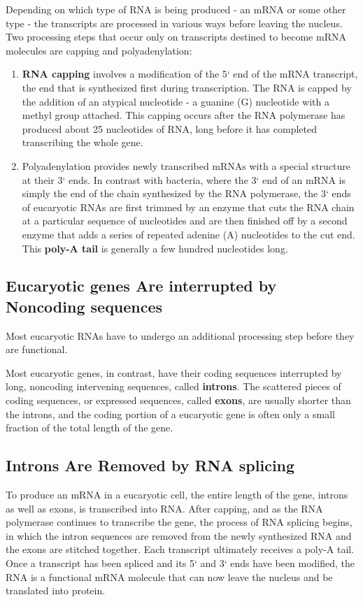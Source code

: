 Depending on which type of RNA is being produced - an mRNA or some
other type - the transcripts are processed in various ways before leaving
the nucleus. Two processing steps that occur only on transcripts destined
to become mRNA molecules are capping and polyadenylation:

\begin{enumerate}
\item \textbf{RNA capping} involves a modification of the 5` end of the mRNA
transcript, the end that is synthesized first during transcription. The
RNA is capped by the addition of an atypical nucleotide - a guanine
(G) nucleotide with a methyl group attached. This capping occurs
after the RNA polymerase has produced about 25 nucleotides of
RNA, long before it has completed transcribing the whole gene.
\item Polyadenylation provides newly transcribed mRNAs with a special
structure at their 3` ends. In contrast with bacteria, where the 3`
end of an mRNA is simply the end of the chain synthesized by the
RNA polymerase, the 3` ends of eucaryotic RNAs are first trimmed
by an enzyme that cuts the RNA chain at a particular sequence of
nucleotides and are then finished off by a second enzyme that adds
a series of repeated adenine (A) nucleotides to the cut end. This
\textbf{poly-A tail} is generally a few hundred nucleotides long.
\end{enumerate}

\subsection{Eucaryotic genes Are interrupted by Noncoding sequences}

Most eucaryotic RNAs have to undergo an additional processing step
before they are functional.

Most eucaryotic genes, in contrast, have their coding sequences interrupted
by long, noncoding intervening sequences, called \textbf{introns}. The scattered pieces
of coding sequences, or expressed sequences, called \textbf{exons}, are usually shorter than
the introns, and the coding portion of a eucaryotic gene is often only a
small fraction of the total length of the gene.

\subsection{Introns Are Removed by RNA splicing}

To produce an mRNA in a eucaryotic cell, the entire length of the gene,
introns as well as exons, is transcribed into RNA. After capping, and as
the RNA polymerase continues to transcribe the gene, the process of RNA
splicing begins, in which the intron sequences are removed from the
newly synthesized RNA and the exons are stitched together. Each transcript
ultimately receives a poly-A tail.
Once a transcript has been spliced and its 5` and
3` ends have been modified, the RNA is a functional mRNA molecule that
can now leave the nucleus and be translated into protein.

